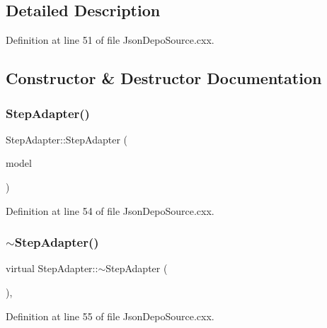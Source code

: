 \subsection{Detailed Description}


Definition at line 51 of file Json\+Depo\+Source.\+cxx.



\subsection{Constructor \& Destructor Documentation}
\mbox{\label{class_step_adapter_af619584838f11883d0971e76a4932749}} 
\subsubsection{\texorpdfstring{Step\+Adapter()}{StepAdapter()}}
{\footnotesize\ttfamily Step\+Adapter\+::\+Step\+Adapter (\begin{DoxyParamCaption}\item[{I\+Recombination\+Model\+::pointer}]{model }\end{DoxyParamCaption})\hspace{0.3cm}{\ttfamily [inline]}}



Definition at line 54 of file Json\+Depo\+Source.\+cxx.

\mbox{\label{class_step_adapter_ab41049e108a34c1992619612db92ac02}} 
\subsubsection{\texorpdfstring{$\sim$\+Step\+Adapter()}{~StepAdapter()}}
{\footnotesize\ttfamily virtual Step\+Adapter\+::$\sim$\+Step\+Adapter (\begin{DoxyParamCaption}{ }\end{DoxyParamCaption})\hspace{0.3cm}{\ttfamily [inline]}, {\ttfamily [virtual]}}



Definition at line 55 of file Json\+Depo\+Source.\+cxx.



